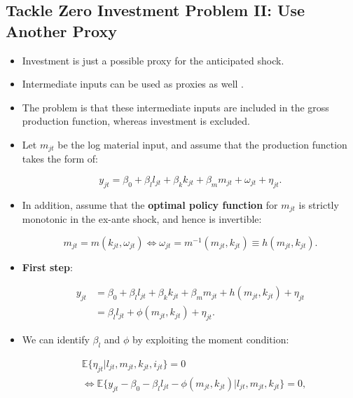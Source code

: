 \documentclass[]{book}
\providecommand{\tightlist}{%
  \setlength{\itemsep}{0pt}\setlength{\parskip}{0pt}}
\theoremstyle{definition}
\theoremstyle{definition}
\theoremstyle{definition}
\theoremstyle{remark}
\begin{document}
\subsection{Tackle Zero Investment Problem II: Use Another
Proxy}\label{tackle-zero-investment-problem-ii-use-another-proxy}

\begin{itemize}
\tightlist
\item
  Investment is just a possible proxy for the anticipated shock.
\item
  Intermediate inputs can be used as proxies as well
  \citep{Levinsohn2003}.
\item
  The problem is that these intermediate inputs are included in the
  gross production function, whereas investment is excluded.
\item
  Let \(m_{jt}\) be the log material input, and assume that the
  production function takes the form of:

  \begin{equation}
  y_{jt} = \beta_0 + \beta_l l_{jt} + \beta_k k_{jt} + \beta_m m_{jt} + \omega_{jt} + \eta_{jt}.
  \end{equation}
\item
  In addition, assume that the \textbf{optimal policy function} for
  \(m_{jt}\) is strictly monotonic in the ex-ante shock, and hence is
  invertible:

  \begin{equation}
  m_{jt} = m(k_{jt}, \omega_{jt}) \Leftrightarrow \omega_{jt} = m^{-1}(m_{jt}, k_{jt}) \equiv h(m_{jt}, k_{jt}). \label{eq:material}
  \end{equation}
\item
  \textbf{First step}:

  \begin{equation}
  \begin{split}
  y_{jt} &= \beta_0 + \beta_l l_{jt} + \beta_k k_{jt} + \beta_m m_{jt} + h(m_{jt}, k_{jt}) + \eta_{jt}\\
  &= \beta_l l_{jt} + \phi(m_{jt}, k_{jt}) + \eta_{jt}.
  \end{split}
  \end{equation}
\item
  We can identify \(\beta_l\) and \(\phi\) by exploiting the moment
  condition:

  \begin{equation}
  \begin{split}
  & \mathbb{E}\{\eta_{jt}|l_{jt}, m_{jt}, k_{jt}, i_{jt}\} = 0\\
  & \Leftrightarrow \mathbb{E}\{y_{jt} - \beta_0 - \beta_l l_{jt} - \phi(m_{jt}, k_{jt}) |l_{jt}, m_{jt}, k_{jt}\} = 0,
  \end{split}
  \end{equation}


\end{itemize}
\end{document}
